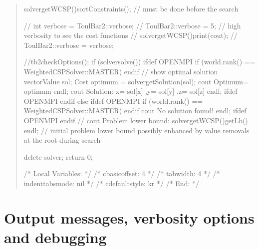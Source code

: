 \documentclass[letterpaper,10pt,openany,oneside,english]{sphinxmanual}
\begin{document}
\begin{quote}
\begin{sphinxVerbatim}[commandchars=\\\{\}]
    solver\PYGZhy{}\PYGZgt{}getWCSP()\PYGZhy{}\PYGZgt{}sortConstraints(); // must be done before the search

    //	int verbose = ToulBar2::verbose;
    //	ToulBar2::verbose = 5;  // high verbosity to see the cost functions
    //	solver\PYGZhy{}\PYGZgt{}getWCSP()\PYGZhy{}\PYGZgt{}print(cout);
    //	ToulBar2::verbose = verbose;

    //tb2checkOptions();
    if (solver\PYGZhy{}\PYGZgt{}solve()) \PYGZob{}
\PYGZsh{}ifdef OPENMPI
        if (world.rank() == WeightedCSPSolver::MASTER) \PYGZob{}
\PYGZsh{}endif
            // show optimal solution
            vector\PYGZlt{}Value\PYGZgt{} sol;
            Cost optimum = solver\PYGZhy{}\PYGZgt{}getSolution(sol);
            cout \PYGZlt{}\PYGZlt{} \PYGZdq{}Optimum=\PYGZdq{} \PYGZlt{}\PYGZlt{} optimum \PYGZlt{}\PYGZlt{} endl;
            cout \PYGZlt{}\PYGZlt{} \PYGZdq{}Solution: x=\PYGZdq{} \PYGZlt{}\PYGZlt{} sol[x] \PYGZlt{}\PYGZlt{} \PYGZdq{} ,y=\PYGZdq{} \PYGZlt{}\PYGZlt{} sol[y] \PYGZlt{}\PYGZlt{} \PYGZdq{} ,z=\PYGZdq{} \PYGZlt{}\PYGZlt{} sol[z] \PYGZlt{}\PYGZlt{} endl;
\PYGZsh{}ifdef OPENMPI
        \PYGZcb{}
\PYGZsh{}endif
    \PYGZcb{} else \PYGZob{}
\PYGZsh{}ifdef OPENMPI
        if (world.rank() == WeightedCSPSolver::MASTER) \PYGZob{}
\PYGZsh{}endif
            cout \PYGZlt{}\PYGZlt{} \PYGZdq{}No solution found!\PYGZdq{} \PYGZlt{}\PYGZlt{} endl;
\PYGZsh{}ifdef OPENMPI
        \PYGZcb{}
\PYGZsh{}endif
    \PYGZcb{}
    // cout \PYGZlt{}\PYGZlt{} \PYGZdq{}Problem lower bound: \PYGZdq{} \PYGZlt{}\PYGZlt{} solver\PYGZhy{}\PYGZgt{}getWCSP()\PYGZhy{}\PYGZgt{}getLb() \PYGZlt{}\PYGZlt{} endl; // initial problem lower bound possibly enhanced by value removals at the root during search

    delete solver;
    return 0;
\PYGZcb{}

/* Local Variables: */
/* c\PYGZhy{}basic\PYGZhy{}offset: 4 */
/* tab\PYGZhy{}width: 4 */
/* indent\PYGZhy{}tabs\PYGZhy{}mode: nil */
/* c\PYGZhy{}default\PYGZhy{}style: \PYGZdq{}k\PYGZam{}r\PYGZdq{} */
/* End: */
\end{sphinxVerbatim}
\end{quote}


\section{Output messages, verbosity options and debugging}
\label{\detokenize{ref/ref_modules:output-messages-verbosity-options-and-debugging}}
\end{document}
